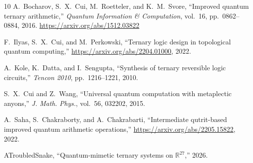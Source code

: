 \documentclass[12pt,a4paper]{article}
\begin{document}
\begin{thebibliography}{10}
A.~Bocharov, S.~X.~Cui, M.~Roetteler, and K.~M.~Svore, ``Improved
quantum ternary arithmetic,''
\emph{Quantum Information \& Computation}, vol.~16, pp.~0862--0884, 2016.
\newline\url{https://arxiv.org/abs/1512.03822}

F.~Ilyas, S.~X.~Cui, and M.~Perkowski, ``Ternary logic design in
topological quantum computing,''
\newline\url{https://arxiv.org/abs/2204.01000}, 2022.

A.~Kole, K.~Datta, and I.~Sengupta, ``Synthesis of ternary reversible
logic circuits,''
\emph{Tencon 2010}, pp.~1216--1221, 2010.

S.~X.~Cui and Z.~Wang, ``Universal quantum computation with metaplectic
anyons,''
\emph{J. Math. Phys.}, vol.~56, 032202, 2015.

A.~Saha, S.~Chakraborty, and A.~Chakrabarti, ``Intermediate qutrit-based
improved quantum arithmetic operations,''
\newline\url{https://arxiv.org/abs/2205.15822}, 2022.

ATroubledSnake, ``Quantum-mimetic ternary systems on $\mathbb{R}^{27}$,''
2026.

\end{thebibliography}
\end{document}
